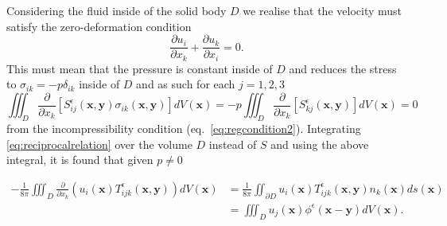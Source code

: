 Considering the fluid inside of the solid body $D$ we realise that the velocity must satisfy the zero-deformation condition
\begin{equation*}
  \frac{\partial u_i}{\partial x_k} + \frac{\partial u_k}{\partial x_i} = 0.
\end{equation*}
This must mean that the pressure is constant inside of $D$ and reduces the stress to $\sigma_{ik} = -p\delta_{ik}$ inside of $D$ and as such for each $j=1,2,3$
\begin{equation*}
  \iiint_{D} \frac{\partial}{\partial x_k}\left[S^\epsilon_{ij}\left(\bm{x}, \bm{y}\right)\sigma_{ik}\left(\bm{x}, \bm{y}\right)\right]dV(\bm{x}) = -p\iiint_{D} \frac{\partial}{\partial x_k}\left[S^\epsilon_{kj}\left(\bm{x}, \bm{y}\right)\right]dV(\bm{x}) = 0
\end{equation*}
from the incompressibility condition (eq.~\ref{eq:regcondition2}). Integrating \cref{eq:reciprocalrelation} over the volume $D$ instead of $S$ and using the above integral, it is found that given $p \neq 0$

\begin{equation}
\begin{aligned}
    \label{eq:BIE4}
    -\frac{1}{8\pi}\iiint_{D} \frac{\partial}{\partial x_k}\left(u_i(\bm{x})T^\epsilon_{ijk}\left(\bm{x}, \bm{y}\right) \right) dV(\bm{x}) &= \frac{1}{8\pi}\iint_{\partial D} u_i(\bm{x})T^\epsilon_{ijk}\left(\bm{x}, \bm{y}\right)n_k(\bm{x}) ds(\bm{x})\\
    &= \iiint_D u_j(\bm{x}) \phi^\epsilon(\bm{x}-\bm{y}) dV(\bm{x}).
\end{aligned}
\end{equation}

